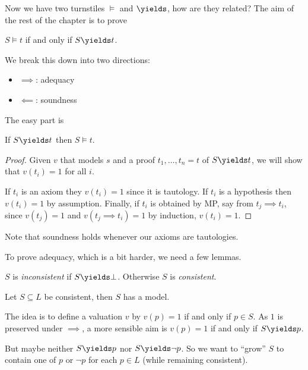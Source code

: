 \documentclass[a4paper]{article}
\begin{document}
Now we have two turnstiles \(\models\) and \(\yields\), how are they related? The aim of the rest of the chapter is to prove

\begin{theorem}
  \(S \models t\) if and only if \(S \yields t\).
\end{theorem}

We break this down into two directions:
\begin{itemize}
\item \(\implies\): adequacy
\item \(\impliedby\): soundness
\end{itemize}

The easy part is

\begin{proposition}[Soundness]
  If \(S \yields t\) then \(S \models t\).
\end{proposition}

\begin{proof}
  Given \(v\) that models \(s\) and a proof \(t_1, \dots, t_n = t\) of \(S \yields t\), we will show that \(v(t_i) = 1\) for all \(i\).

  If \(t_i\) is an axiom they \(v(t_i) = 1\) since it is tautology. If \(t_i\) is a hypothesis then \(v(t_i) = 1\) by assumption. Finally, if \(t_i\) is obtained by MP, say from \(t_j \implies t_i\), since \(v(t_j) = 1\) and \(v(t_j \implies t_i) = 1\) by induction, \(v(t_i) = 1\).
\end{proof}

Note that soundness holds whenever our axioms are tautologies.

To prove adequacy, which is a bit harder, we need a few lemmas.

\begin{definition}[Consistency]
  \(S\) is \emph{inconsistent} if \(S \yields \bot\). Otherwise \(S\) is \emph{consistent}.
\end{definition}

\begin{theorem}
  Let \(S \subseteq L\) be consistent, then \(S\) has a model.
\end{theorem}

The idea is to define a valuation \(v\) by \(v(p) = 1\) if and only if \(p \in S\). As \(1\) is preserved under \(\implies\), a more sensible aim is \(v(p) = 1\) if and only if \(S \yields p\).

But maybe neither \(S \yields p\) nor \(S \yields \neg p\). So we want to ``grow'' \(S\) to contain one of \(p\) or \(\neg p\) for each \(p \in L\) (while remaining consistent).
\end{document}
